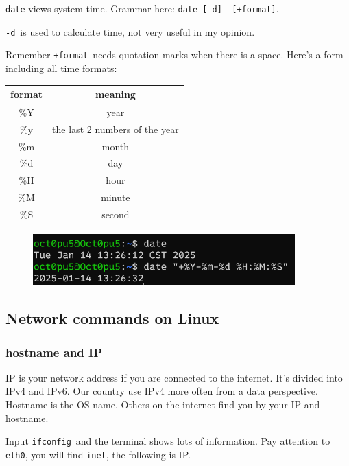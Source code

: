 \documentclass[12pt]{ctexart}
\begin{document}
\texttt{date} views system time. Grammar here:
\texttt{date\ {[}-d{]}\ \ {[}+format{]}}.

\texttt{-d}\ is used to calculate time, not very useful in my opinion.

Remember \texttt{+format}\ needs quotation marks when there is a space.
Here's a form including all time formats:

\begin{table}[H]
    \centering
    \begin{tabular}{cc}
    \toprule
    format & meaning \\
    \midrule
    \%Y & year \\
    \%y & the last 2 numbers of the year \\
    \%m & month \\
    \%d & day \\
    \%H & hour \\
    \%M & minute \\
    \%S & second \\
    \bottomrule
    \end{tabular}
\end{table}

\begin{figure}[H]
    \centering
    \includegraphics[width=0.9\textwidth,keepaspectratio]{assets/Linux/1.8 Some trivial contents on Linux/3.png}
\end{figure}

\subsection{\textbf{Network commands on Linux}}

\subsubsection{\textbf{hostname and IP}}

IP is your network address if you are connected to the internet.
It's divided into IPv4 and IPv6. Our country use IPv4
more often from a data perspective. Hostname is the OS name. Others on
the internet find you by your IP and hostname.

Input \texttt{ifconfig}\ and the terminal shows lots of information. Pay
attention to \texttt{eth0}, you will find \texttt{inet}, the following
is IP.
\end{document}
